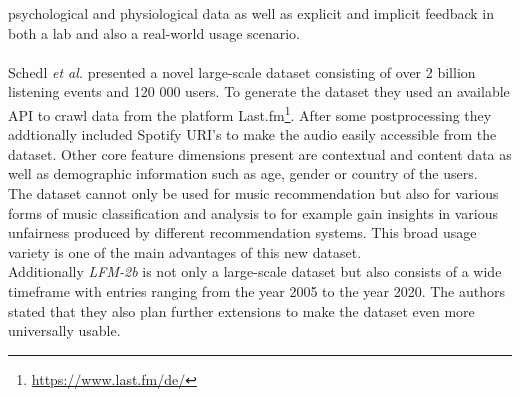 \documentclass[runningheads,a4paper]{llncs}
\begin{document}
psychological and physiological data as well as explicit and implicit feedback in both a lab and also a real-world usage scenario. \cite{grigorev2024situnes}\\
\\
Schedl \textit{et al.} presented a novel large-scale dataset consisting of over 2 billion listening events and 120 000 users.
To generate the dataset they used an available API to crawl data from the platform Last.fm\footnote{\url{https://www.last.fm/de/}}.
After some postprocessing they addtionally included Spotify URI's to make the audio easily accessible from the dataset. 
Other core feature dimensions present are contextual and content data as well as demographic information such as age, gender or country of the users.\\
The dataset cannot only be used for music recommendation but also for various forms of music classification and analysis to for example gain insights in various unfairness produced by different recommendation systems.
This broad usage variety is one of the main advantages of this new dataset.\\
Additionally \textit{LFM-2b} is not only a large-scale dataset but also consists of a wide timeframe with entries ranging from the year 2005 to the year 2020. 
The authors stated that they also plan further extensions to make the dataset even more universally usable.\cite{schedl2022lfm}
\end{document}
